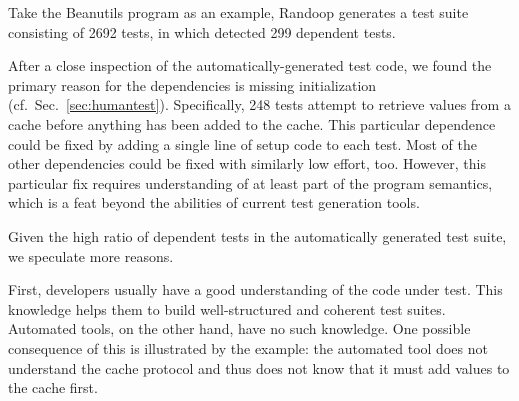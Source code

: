 \newcommand{\pub}{\texttt{Prop\-er\-ty\-Utils\-Bean}}
\newcommand{\fhm}{\texttt{Fast\-Hash\-Map}}
\newcommand{\cub}{\texttt{ConvertUtilsBean}}

Take the Beanutils program as an example, Randoop generates a test suite consisting of
2692 tests, in which \ourtool detected 299 dependent tests.

After a close inspection of the automatically-generated test code, we found
the primary reason for the dependencies is missing initialization 
(cf.~Sec.~\ref{sec:humantest}).
Specifically, 248 tests attempt to retrieve values from a cache before
anything has been added to the cache. This particular dependence could be
fixed by adding a single line of setup code to each test.
Most of the other dependencies could be fixed with similarly low effort, too.
However, this particular fix requires understanding of at least part
of the program semantics, which is a feat beyond the abilities of
current test generation tools.



Given the high ratio of dependent tests in the automatically generated
test suite, we speculate more reasons.

First, developers usually have a good understanding
of the code under test. This knowledge helps them to
build well-structured and coherent test suites.
Automated tools, on the other hand, have no such knowledge. One
possible consequence of this is illustrated by the example: the
automated tool does not understand the cache protocol and thus does
not know that it must add values to the cache first. 

